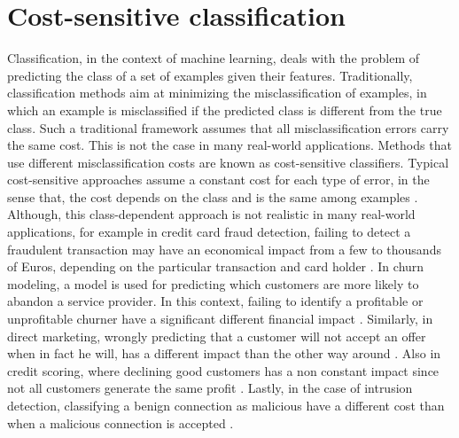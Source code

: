 % 


\section{Cost-sensitive classification}
  Classification, in the context of machine learning, deals with the problem of predicting the class
  of a set of examples given their features. Traditionally, classification methods aim at 
  minimizing the misclassification of examples, in which an example is misclassified if the 
  predicted class is different from the true class. Such a traditional framework assumes that all 
  misclassification errors carry the same cost. This is not the case in many real-world 
  applications. Methods that use different misclassification costs are known as cost-sensitive 
  classifiers. Typical cost-sensitive approaches assume a constant cost for each type of error, in 
	the sense that, the cost depends on the class and is the same among examples 
	\citep{Elkan2001,Kim2012}. 
  Although, this class-dependent approach is not realistic in many real-world applications, for 
	example in credit card fraud detection, failing to detect a fraudulent transaction may have an 
  economical impact from a few to thousands of Euros, depending on the particular transaction and 
	card holder \citep{Sahin2013}. In churn modeling, a model is used for predicting which
	customers are more likely to abandon a service provider. In this context, failing to identify a 
	profitable or unprofitable churner have a significant different financial impact 
	\citep{Glady2009}. Similarly, in direct marketing, wrongly predicting that a customer will not 
	accept an offer when in fact he will, has a different impact than the other way around 
	\citep{Zadrozny2003}. Also in credit scoring, where declining good customers has a non constant 
	impact since not all 	customers generate the same profit \citep{Verbraken2014}. Lastly, in the 
	case of intrusion 	detection, classifying a benign connection as malicious have a different cost 
	than when a 	malicious connection is accepted \citep{Ma2011}.

